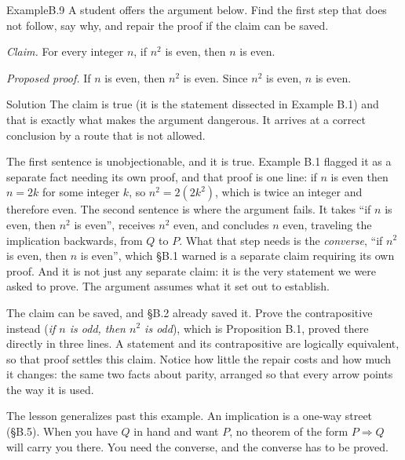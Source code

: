 \documentclass[a4paper,12pt,oneside]{memoir}
\begin{document}
\begin{workedexample}
\begin{envexample}{Example}{B.9}{}
A student offers the argument below. Find the first step that does not follow, say why, and repair the proof if the claim can be saved.

\emph{Claim.} For every integer \(n\), if \(n^{2}\) is even, then \(n\) is even.

\emph{Proposed proof.} If \(n\) is even, then \(n^{2}\) is even. Since \(n^{2}\) is even, \(n\) is even.
\end{envexample}
\begin{envsolution}{Solution}{}{}
The claim is true (it is the statement dissected in Example B.1) and that is exactly what makes the argument dangerous. It arrives at a correct conclusion by a route that is not allowed.

The first sentence is unobjectionable, and it is true. Example B.1 flagged it as a separate fact needing its own proof, and that proof is one line: if \(n\) is even then \(n = 2k\) for some integer \(k\), so \(n^{2} = 2(2k^{2})\), which is twice an integer and therefore even. The second sentence is where the argument fails. It takes “if \(n\) is even, then \(n^{2}\) is even”, receives \(n^{2}\) even, and concludes \(n\) even, traveling the implication backwards, from \(Q\) to \(P\). What that step needs is the \emph{converse}, “if \(n^{2}\) is even, then \(n\) is even”, which §B.1 warned is a separate claim requiring its own proof. And it is not just any separate claim: it is the very statement we were asked to prove. The argument assumes what it set out to establish.

The claim can be saved, and §B.2 already saved it. Prove the contrapositive instead (\emph{if \(n\) is odd, then \(n^{2}\) is odd}), which is Proposition B.1, proved there directly in three lines. A statement and its contrapositive are logically equivalent, so that proof settles this claim. Notice how little the repair costs and how much it changes: the same two facts about parity, arranged so that every arrow points the way it is used.

The lesson generalizes past this example. An implication is a one-way street (§B.5). When you have \(Q\) in hand and want \(P\), no theorem of the form \(P \Rightarrow Q\) will carry you there. You need the converse, and the converse has to be proved.
\end{envsolution}
\end{workedexample}
\end{document}
